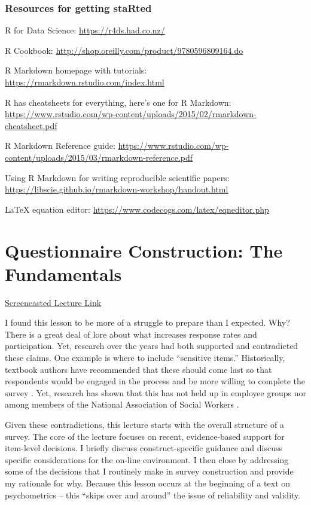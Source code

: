 \documentclass[
  english,
]{book}
\begin{document}
\hypertarget{resources-for-getting-started}{%
\subsection{Resources for getting staRted}\label{resources-for-getting-started}}

R for Data Science: \url{https://r4ds.had.co.nz/}

R Cookbook: \url{http://shop.oreilly.com/product/9780596809164.do}

R Markdown homepage with tutorials: \url{https://rmarkdown.rstudio.com/index.html}

R has cheatsheets for everything, here's one for R Markdown: \url{https://www.rstudio.com/wp-content/uploads/2015/02/rmarkdown-cheatsheet.pdf}

R Markdown Reference guide: \url{https://www.rstudio.com/wp-content/uploads/2015/03/rmarkdown-reference.pdf}

Using R Markdown for writing reproducible scientific papers: \url{https://libscie.github.io/rmarkdown-workshop/handout.html}

LaTeX equation editor: \url{https://www.codecogs.com/latex/eqneditor.php}

\hypertarget{QuestCon}{%
\chapter{Questionnaire Construction: The Fundamentals}\label{QuestCon}}

\href{https://spu.hosted.panopto.com/Panopto/Pages/Viewer.aspx?pid=ec7c8795-a0af-4f23-9145-ad9a00355e3c}{Screencasted Lecture Link}

I found this lesson to be more of a struggle to prepare than I expected. Why? There is a great deal of lore about what increases response rates and participation. Yet, research over the years had both supported and contradicted these claims. One example is where to include ``sensitive items.'' Historically, textbook authors have recommended that these should come last so that respondents would be engaged in the process and be more willing to complete the survey \citep{krathwohl_methods_2009, rowley_designing_2014}. Yet, research has shown that this has not held up in employee groups \citep{roberson_questionnaire_1990} nor among members of the National Association of Social Workers \citep{robert_g._green_should_2000}.

Given these contradictions, this lecture starts with the overall structure of a survey. The core of the lecture focuses on recent, evidence-based support for item-level decisions. I briefly discuss construct-specific guidance and discuss specific considerations for the on-line environment. I then close by addressing some of the decisions that I routinely make in survey construction and provide my rationale for why. Because this lesson occurs at the beginning of a text on psychometrics -- this ``skips over and around'' the issue of reliability and validity.
\end{document}
